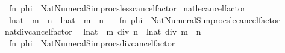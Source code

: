 \begin{isabellebody}
\ \ {\isacartoucheopen}fn\ phi\ {\isacharequal}{\kern0pt}{\isachargreater}{\kern0pt}\ Nat{\isacharunderscore}{\kern0pt}Numeral{\isacharunderscore}{\kern0pt}Simprocs{\isachardot}{\kern0pt}less{\isacharunderscore}{\kern0pt}cancel{\isacharunderscore}{\kern0pt}factor{\isacartoucheclose}\isanewline
\isanewline
{}\isamarkupfalse%
\ nat{\isacharunderscore}{\kern0pt}le{\isacharunderscore}{\kern0pt}cancel{\isacharunderscore}{\kern0pt}factor\isanewline
\ \ {\isacharparenleft}{\kern0pt}{\isachardoublequoteopen}{\isacharparenleft}{\kern0pt}l{\isacharcolon}{\kern0pt}{\isacharcolon}{\kern0pt}nat{\isacharparenright}{\kern0pt}\ {\isacharasterisk}{\kern0pt}\ m\ {\isacharless}{\kern0pt}{\isacharequal}{\kern0pt}\ n{\isachardoublequoteclose}\ {\isacharbar}{\kern0pt}\ {\isachardoublequoteopen}{\isacharparenleft}{\kern0pt}l{\isacharcolon}{\kern0pt}{\isacharcolon}{\kern0pt}nat{\isacharparenright}{\kern0pt}\ {\isacharless}{\kern0pt}{\isacharequal}{\kern0pt}\ m\ {\isacharasterisk}{\kern0pt}\ n{\isachardoublequoteclose}{\isacharparenright}{\kern0pt}\ {\isacharequal}{\kern0pt}\isanewline
\ \ {\isacartoucheopen}fn\ phi\ {\isacharequal}{\kern0pt}{\isachargreater}{\kern0pt}\ Nat{\isacharunderscore}{\kern0pt}Numeral{\isacharunderscore}{\kern0pt}Simprocs{\isachardot}{\kern0pt}le{\isacharunderscore}{\kern0pt}cancel{\isacharunderscore}{\kern0pt}factor{\isacartoucheclose}\isanewline
\isanewline
{}\isamarkupfalse%
\ nat{\isacharunderscore}{\kern0pt}div{\isacharunderscore}{\kern0pt}cancel{\isacharunderscore}{\kern0pt}factor\isanewline
\ \ {\isacharparenleft}{\kern0pt}{\isachardoublequoteopen}{\isacharparenleft}{\kern0pt}{\isacharparenleft}{\kern0pt}l{\isacharcolon}{\kern0pt}{\isacharcolon}{\kern0pt}nat{\isacharparenright}{\kern0pt}\ {\isacharasterisk}{\kern0pt}\ m{\isacharparenright}{\kern0pt}\ div\ n{\isachardoublequoteclose}\ {\isacharbar}{\kern0pt}\ {\isachardoublequoteopen}{\isacharparenleft}{\kern0pt}l{\isacharcolon}{\kern0pt}{\isacharcolon}{\kern0pt}nat{\isacharparenright}{\kern0pt}\ div\ {\isacharparenleft}{\kern0pt}m\ {\isacharasterisk}{\kern0pt}\ n{\isacharparenright}{\kern0pt}{\isachardoublequoteclose}{\isacharparenright}{\kern0pt}\ {\isacharequal}{\kern0pt}\isanewline
\ \ {\isacartoucheopen}fn\ phi\ {\isacharequal}{\kern0pt}{\isachargreater}{\kern0pt}\ Nat{\isacharunderscore}{\kern0pt}Numeral{\isacharunderscore}{\kern0pt}Simprocs{\isachardot}{\kern0pt}div{\isacharunderscore}{\kern0pt}cancel{\isacharunderscore}{\kern0pt}factor{\isacartoucheclose}\isanewline
\isanewline
{}\isamarkupfalse%

\end{isabellebody}
